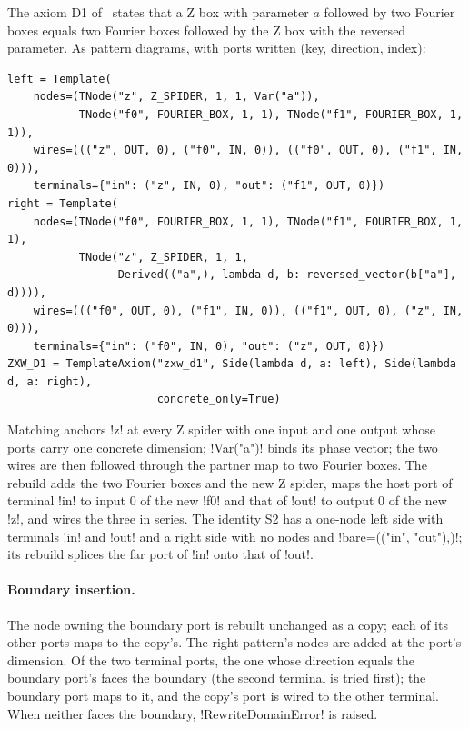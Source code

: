 \begin{example}\label{ex:rewriting-template}
The axiom D1 of~\cite{poor2023zxw} states that a Z box with parameter $a$ followed by two Fourier
boxes equals two Fourier boxes followed by the Z box with the reversed parameter. As pattern
diagrams, with ports written (key, direction, index):
\begin{lstlisting}[style=python]
left = Template(
    nodes=(TNode("z", Z_SPIDER, 1, 1, Var("a")),
           TNode("f0", FOURIER_BOX, 1, 1), TNode("f1", FOURIER_BOX, 1, 1)),
    wires=((("z", OUT, 0), ("f0", IN, 0)), (("f0", OUT, 0), ("f1", IN, 0))),
    terminals={"in": ("z", IN, 0), "out": ("f1", OUT, 0)})
right = Template(
    nodes=(TNode("f0", FOURIER_BOX, 1, 1), TNode("f1", FOURIER_BOX, 1, 1),
           TNode("z", Z_SPIDER, 1, 1,
                 Derived(("a",), lambda d, b: reversed_vector(b["a"], d)))),
    wires=((("f0", OUT, 0), ("f1", IN, 0)), (("f1", OUT, 0), ("z", IN, 0))),
    terminals={"in": ("f0", IN, 0), "out": ("z", OUT, 0)})
ZXW_D1 = TemplateAxiom("zxw_d1", Side(lambda d, a: left), Side(lambda d, a: right),
                       concrete_only=True)
\end{lstlisting}
Matching anchors \code!z! at every Z spider with one input and one output whose ports carry one
concrete dimension; \py!Var("a")! binds its phase vector; the two wires are then followed through
the partner map to two Fourier boxes. The rebuild adds the two Fourier boxes and the new Z spider,
maps the host port of terminal \code!in! to input $0$ of the new \code!f0! and that of \code!out! to
output $0$ of the new \code!z!, and wires the three in series. The identity S2 has a one-node left
side with terminals \code!in! and \code!out! and a right side with no nodes and
\py!bare=(("in", "out"),)!; its rebuild splices the far port of \code!in! onto that of \code!out!.
\end{example}

\paragraph{Boundary insertion.}
The node owning the boundary port is rebuilt unchanged as a copy; each of its other ports maps to
the copy's. The right pattern's nodes are added at the port's dimension. Of the two terminal ports,
the one whose direction equals the boundary port's faces the boundary (the second terminal is
tried first); the boundary port maps to it, and the copy's port is wired to the other terminal.
When neither faces the boundary, \py!RewriteDomainError! is raised.

